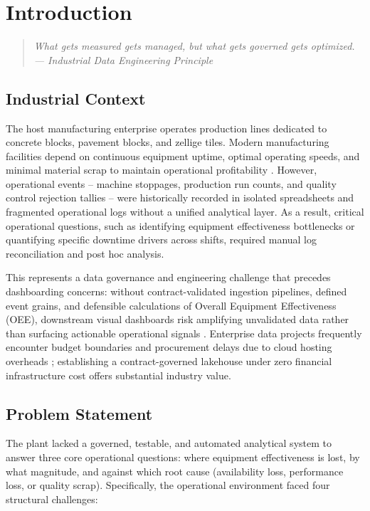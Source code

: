\documentclass[12pt, a4paper]{report}
\newcommand{\epigraph}[2]{%
  \begin{quote}
    \raggedleft \small \itshape \color{primary!80!black} #1 \\
    \vspace{0.1cm}
    \normalfont \color{darkgray} #2
  \end{quote}
  \vspace{0.4cm}
}
\begin{document}
\chapter{Introduction}
\label{chap:introduction}

\epigraph{What gets measured gets managed, but what gets governed gets optimized.}{--- Industrial Data Engineering Principle}

\section{Industrial Context}
The host manufacturing enterprise operates production lines dedicated to concrete blocks, pavement blocks, and zellige tiles. Modern manufacturing facilities depend on continuous equipment uptime, optimal operating speeds, and minimal material scrap to maintain operational profitability \cite{nakajima_tpm, iso_22400}. However, operational events -- machine stoppages, production run counts, and quality control rejection tallies -- were historically recorded in isolated spreadsheets and fragmented operational logs without a unified analytical layer. As a result, critical operational questions, such as identifying equipment effectiveness bottlenecks or quantifying specific downtime drivers across shifts, required manual log reconciliation and post hoc analysis.

This represents a data governance and engineering challenge that precedes dashboarding concerns: without contract-validated ingestion pipelines, defined event grains, and defensible calculations of Overall Equipment Effectiveness (OEE), downstream visual dashboards risk amplifying unvalidated data rather than surfacing actionable operational signals \cite{data_contracts_guide, kimball_dwtoolkit}. Enterprise data projects frequently encounter budget boundaries and procurement delays due to cloud hosting overheads \cite{google_bq_sandbox}; establishing a contract-governed lakehouse under zero financial infrastructure cost offers substantial industry value.

\section{Problem Statement}
The plant lacked a governed, testable, and automated analytical system to answer three core operational questions: where equipment effectiveness is lost, by what magnitude, and against which root cause (availability loss, performance loss, or quality scrap). Specifically, the operational environment faced four structural challenges:
\end{document}
